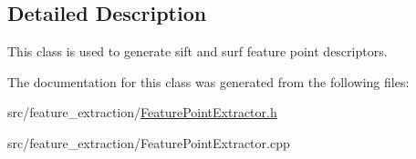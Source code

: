 \subsection{Detailed Description}
This class is used to generate sift and surf feature point descriptors. 

The documentation for this class was generated from the following files\+:\begin{DoxyCompactItemize}
\item 
src/feature\+\_\+extraction/\mbox{\hyperlink{_feature_point_extractor_8h}{Feature\+Point\+Extractor.\+h}}\item 
src/feature\+\_\+extraction/Feature\+Point\+Extractor.\+cpp\end{DoxyCompactItemize}
